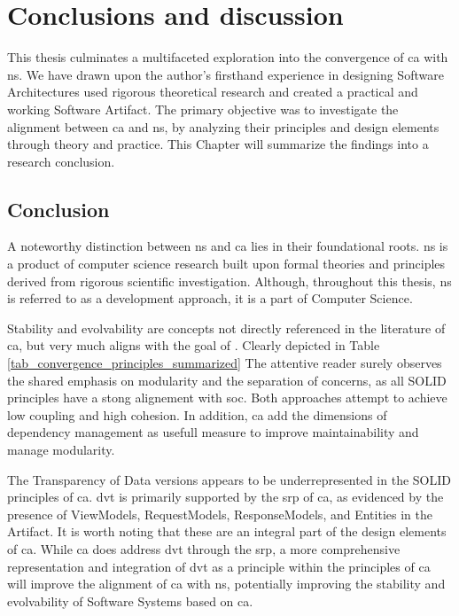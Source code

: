\chapter{Conclusions and discussion} \label{chap_conclusions}

This thesis culminates a multifaceted exploration into the convergence of \gls{ca} with
\gls{ns}. We have drawn upon the author's firsthand experience in designing Software
Architectures used rigorous theoretical research and created a practical and working
Software Artifact. The primary objective was to investigate the alignment between \gls{ca}
and \gls{ns}, by analyzing their principles and design elements through theory and
practice. This Chapter will summarize the findings into a research conclusion.

\section{Conclusion}

A noteworthy distinction between \gls{ns} and \gls{ca} lies in their foundational roots.
\gls{ns} is a product of computer science research built upon formal theories and
principles derived from rigorous scientific investigation. Although, throughout this
thesis, \gls{ns} is referred to as a development approach, it is a part of Computer
Science.

Stability and evolvability are concepts not directly referenced in the literature of
\gls{ca}, but very much aligns with the goal of \textcite[31]{mannaert_normalized_2016}.
Clearly depicted in Table \ref{tab_convergence_principles_summarized} The attentive reader
surely observes the shared emphasis on modularity and the separation of concerns, as all
SOLID principles have a stong alignement with \gls{soc}. Both approaches attempt to
achieve low coupling and high cohesion. In addition, \gls{ca} add the dimensions of
dependency management as usefull measure to improve maintainability and manage modularity.

The Transparency of Data versions appears to be underrepresented in the SOLID principles
of \gls{ca}. \gls{dvt} is primarily supported by the \gls{srp} of \gls{ca}, as evidenced
by the presence of ViewModels, RequestModels, ResponseModels, and Entities in the
Artifact. It is worth noting that these are an integral part of the design elements of
\gls{ca}. While \gls{ca} does address \gls{dvt} through the \gls{srp}, a more
comprehensive representation and integration of \gls{dvt} as a principle within the
principles of \gls{ca} will improve the alignment of \gls{ca} with \gls{ns}, potentially
improving the stability and evolvability of Software Systems based on \gls{ca}.

